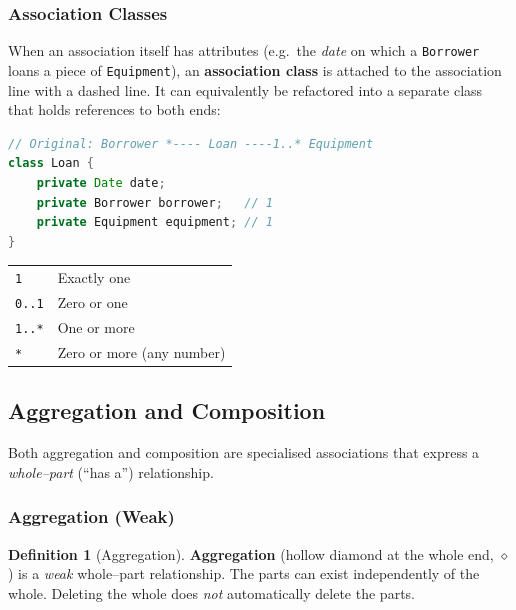 \documentclass[11pt, a4paper, notitlepage]{report}
\theoremstyle{definition}
\newtheorem{definition}[theorem]{Definition}
\theoremstyle{remark}
\theoremstyle{definition}
\begin{document}
\subsubsection{Association Classes}

When an association itself has attributes (e.g.\ the \emph{date} on which a
\texttt{Borrower} loans a piece of \texttt{Equipment}), an
\textbf{association class} is attached to the association line with a dashed
line.  It can equivalently be refactored into a separate class that holds
references to both ends:

\begin{lstlisting}[language=Java,caption={Association class refactored to separate class}]
// Original: Borrower *---- Loan ----1..* Equipment
class Loan {
    private Date date;
    private Borrower borrower;   // 1
    private Equipment equipment; // 1
}
\end{lstlisting}

\begin{keyresult}[title={Key Result: Multiplicity Notation}]
  \begin{tabular}{@{}ll@{}}
    \texttt{1}    & Exactly one \\
    \texttt{0..1} & Zero or one \\
    \texttt{1..*} & One or more \\
    \texttt{*}    & Zero or more (any number) \\
  \end{tabular}
\end{keyresult}

\subsection{Aggregation and Composition}
\label{subsec:ch6-agg-comp}

Both aggregation and composition are specialised associations that express a
\emph{whole--part} (``has a'') relationship.

\subsubsection{Aggregation (Weak)}

\begin{definition}[Aggregation]
\label{def:ch6-aggregation}
\textbf{Aggregation} (hollow diamond at the whole end, $\diamond$) is a
\emph{weak} whole--part relationship.  The parts can exist independently of
the whole.  Deleting the whole does \emph{not} automatically delete the parts.
\end{definition}
\end{document}
